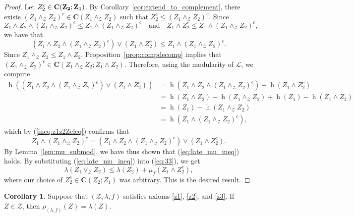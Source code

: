 \documentclass[a4paper,11pt,reqno]{article}
\theoremstyle{definition}
\newtheorem{corollary}[theorem]{{{Corollary}}}
\newcommand{\mZ}{\mathcal{Z}}
\newcommand{\cC}{\textup{\bf{C}}}
\begin{document}
\begin{proof}
    Let $Z_2^c \in \cC(Z_2;Z_1)$. By Corollary~\ref{cor:extend_to_complement}, there exists $(Z_1 \wedge_\mZ Z_2)^c\in\mathbf{C}(Z_1\wedge_\mathcal{Z}Z_2)$ such that $Z_2^c\leq(Z_1\wedge_\mathcal{Z}Z_2)^c$.
    Since 
    \[
    Z_1\wedge Z_2\wedge (Z_1\wedge_\mathcal{Z} Z_2)^c \leq Z_1\wedge(Z_1\wedge_\mathcal{Z} Z_2)^c \quad \text{and} \quad Z_1\wedge Z_2^c \leq Z_1\wedge(Z_1\wedge_\mathcal{Z} Z_2)^c,
    \]
    we have that 
    \begin{equation}\label{ineq:z1z2Zcleq}
        (Z_1\wedge Z_2\wedge(Z_1\wedge_\mathcal{Z} Z_2)^c )\vee (Z_1\wedge Z_2^c) \leq Z_1\wedge(Z_1\wedge_\mathcal{Z} Z_2)^c.
    \end{equation}
    Since $Z_1\wedge_\mathcal{Z}Z_2\leq Z_1\wedge Z_2$, Proposition~\ref{prop:compdecomp} implies that $(Z_1\wedge_\mathcal{Z}Z_2)^c\in\mathbf{C}(Z_1\wedge_\mathcal{Z}Z_2;Z_1\wedge Z_2)$. Therefore, using the modularity of $\mathcal{L}$, we compute
    \begin{align*}
        \operatorname{h}((Z_1\wedge Z_2\wedge(Z_1\wedge_\mathcal{Z} Z_2)^c )\dot\vee (Z_1\wedge Z_2^c))&=\operatorname{h}(Z_1\wedge Z_2\wedge (Z_1\wedge_\mathcal{Z} Z_2)^c)+\operatorname{h}(Z_1\wedge Z_2^c)\\
        &= \operatorname{h}(Z_1\wedge Z_2) - \operatorname{h}(Z_1\wedge_\mathcal{Z} Z_2) + \operatorname{h}(Z_1) - \operatorname{h}(Z_1\wedge Z_2) \\
        &= \operatorname{h}(Z_1) - \operatorname{h}(Z_1\wedge_\mathcal{Z} Z_2) \\
        &= \operatorname{h}(Z_1\wedge(Z_1\wedge_\mathcal{Z} Z_2)^c),
    \end{align*}
    which by (\ref{ineq:z1z2Zcleq}) confirms that 
    \[
    Z_1\wedge(Z_1\wedge_\mathcal{Z} Z_2)^c = (Z_1\wedge Z_2\wedge (Z_1\wedge_\mathcal{Z} Z_2)^c)\dot\vee(Z_1\wedge Z_2^c).
    \]
    By Lemma~\ref{lem:mu_submod}, we have thus shown that (\ref{eq:late_mu_ineq}) holds. By substituting (\ref{eq:late_mu_ineq}) into (\ref{eq:33}), we get
    $$\lambda(Z_1\vee_\mathcal{Z}Z_2)\leq\lambda(Z_2)+\mu_f(Z_1\wedge Z_2^c),$$
    where our choice of $Z_2^c\in\mathbf{C}(Z_2;Z_1)$ was arbitrary. This is the desired result.
\end{proof}

\begin{corollary}\label{cor:lambdaZ_is_rhoZ}
    Suppose that $(\mZ,\lambda,f)$ satisfies axioms \ref{z1}, \ref{z2}, and \ref{z3}. If $Z\in\mathcal{Z}$, then $\rho_{(\lambda,f)}(Z) = \lambda(Z)$.
\end{corollary}
\end{document}

